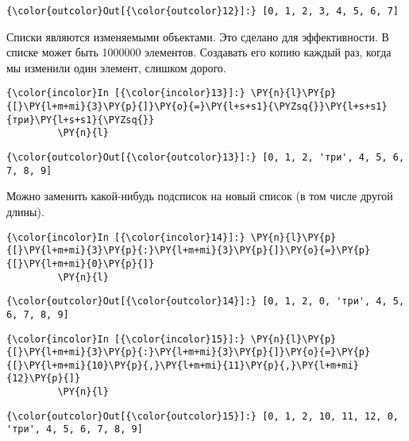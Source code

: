             \begin{Verbatim}[commandchars=\\\{\}]
{\color{outcolor}Out[{\color{outcolor}12}]:} [0, 1, 2, 3, 4, 5, 6, 7]
\end{Verbatim}
        
    Списки являются изменяемыми объектами. Это сделано для эффективности. В
списке может быть 1000000 элементов. Создавать его копию каждый раз,
когда мы изменили один элемент, слишком дорого.

    \begin{Verbatim}[commandchars=\\\{\}]
{\color{incolor}In [{\color{incolor}13}]:} \PY{n}{l}\PY{p}{[}\PY{l+m+mi}{3}\PY{p}{]}\PY{o}{=}\PY{l+s+s1}{\PYZsq{}}\PY{l+s+s1}{три}\PY{l+s+s1}{\PYZsq{}}
         \PY{n}{l}
\end{Verbatim}

            \begin{Verbatim}[commandchars=\\\{\}]
{\color{outcolor}Out[{\color{outcolor}13}]:} [0, 1, 2, 'три', 4, 5, 6, 7, 8, 9]
\end{Verbatim}
        
    Можно заменить какой-нибудь подсписок на новый список (в том числе
другой длины).

    \begin{Verbatim}[commandchars=\\\{\}]
{\color{incolor}In [{\color{incolor}14}]:} \PY{n}{l}\PY{p}{[}\PY{l+m+mi}{3}\PY{p}{:}\PY{l+m+mi}{3}\PY{p}{]}\PY{o}{=}\PY{p}{[}\PY{l+m+mi}{0}\PY{p}{]}
         \PY{n}{l}
\end{Verbatim}

            \begin{Verbatim}[commandchars=\\\{\}]
{\color{outcolor}Out[{\color{outcolor}14}]:} [0, 1, 2, 0, 'три', 4, 5, 6, 7, 8, 9]
\end{Verbatim}
        
    \begin{Verbatim}[commandchars=\\\{\}]
{\color{incolor}In [{\color{incolor}15}]:} \PY{n}{l}\PY{p}{[}\PY{l+m+mi}{3}\PY{p}{:}\PY{l+m+mi}{3}\PY{p}{]}\PY{o}{=}\PY{p}{[}\PY{l+m+mi}{10}\PY{p}{,}\PY{l+m+mi}{11}\PY{p}{,}\PY{l+m+mi}{12}\PY{p}{]}
         \PY{n}{l}
\end{Verbatim}

            \begin{Verbatim}[commandchars=\\\{\}]
{\color{outcolor}Out[{\color{outcolor}15}]:} [0, 1, 2, 10, 11, 12, 0, 'три', 4, 5, 6, 7, 8, 9]
\end{Verbatim}
        
